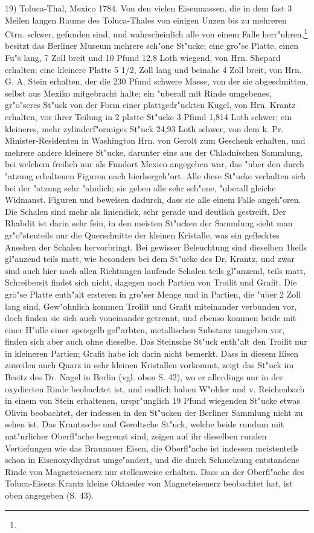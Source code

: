 \documentclass[a4paper, 11pt, oneside]{article}
\begin{document}
19) Toluca-Thal, Mexico 1784. Von den vielen Eisenmassen, die in dem fast 3 Meilen langen Raume des Toluca-Thales von einigen Unzen bis zu mehreren Ctrn. schwer, gefunden sind, und wahrscheinlich alle von einem Falle herr"uhren,\footnote{} besitzt das Berliner Museum mehrere sch"one St"ucke; eine gro"se Platte, einen Fu"s lang, 7 Zoll breit und 10 Pfund 12,8 Loth wiegend, von Hrn. Shepard erhalten; eine kleinere Platte 5 1/2, Zoll lang und beinahe 4 Zoll breit, von Hrn. G. A. Stein erhalten, der die 230 Pfund schwere Masse, von der sie abgeschnitten, selbst aus Mexiko mitgebracht halte; ein "uberall mit Rinde umgebenes, gr"o"seres St"uck von der Form einer plattgedr"uckten Kugel, von Hrn. Krantz erhalten, vor ihrer Teilung in 2 platte St"ucke 3 Pfund 1,814 Loth schwer; ein kleineres, mehr zylinderf"ormiges St"uck 24,93 Loth schwer, von dem k. Pr. Minister-Residenten in Washington Hrn. von Gerolt zum Geschenk erhalten, und mehrere andere kleinere St"ucke, darunter eins aus der Chladnischen Sammlung, bei welchem freilich nur als Fundort Mexico angegeben war, das "uber den durch "atzung erhaltenen Figuren nach hierhergeh"ort. Alle diese St"ucke verhalten sich bei der "atzung sehr "ahnlich; sie geben alle sehr sch"one, "uberall gleiche Widmanst. Figuren und beweisen dadurch, dass sie alle einem Falle angeh"oren. Die Schalen sind mehr als liniendick, sehr gerade und deutlich gestreift. Der Rhabdit ist darin sehr fein, in den meisten St"ucken der Sammlung sieht man gr"o"stenteils nur die Querschnitte der kleinen Kristalle, was ein geflecktes Ansehen der Schalen hervorbringt. Bei gewisser Beleuchtung sind dieselben 1heils gl"anzend teils matt, wie besonders bei dem St"ucke des Dr. Krantz, und zwar sind auch hier nach allen Richtungen laufende Schalen teils gl"anzend, teils matt, Schreibersit findet sich nicht, dagegen noch Partien von Troilit und Grafit. Die gro"se Platte enth"alt ersteren in gro"ser Menge und in Partien, die "uber 2 Zoll lang sind. Gew"ohnlich kommen Troilit und Grafit miteinander verbunden vor, doch finden sie sich auch voneinander getrennt, und ebenso kommen beide mit einer H"ulle einer speisgelb gef"arbten, metallischen Substanz umgeben vor, finden sich aber auch ohne dieselbe. Das Steinsche St"uck enth"alt den Troilit nur in kleineren Partien; Grafit habe ich darin nicht bemerkt. Dass in diesem Eisen zuweilen auch Quarz in sehr kleinen Kristallen vorkommt, zeigt das St"uck im Besitz des Dr. Nagel in Berlin (vgl. oben S. 42), wo er allerdings nur in der oxydierten Rinde beobachtet ist, und endlich haben W"ohler und v. Reichenbach in einem von Stein erhaltenen, urspr"unglich 19 Pfund wiegenden St"ucke etwas Olivin beobachtet, der indessen in den St"ucken der Berliner Sammlung nicht zu sehen ist. Das Krantzsche und Geroltsche St"uck, welche beide rundum mit nat"urlicher Oberfl"ache begrenzt sind, zeigen auf ihr dieselben runden Vertiefungen wie das Braunauer Eisen, die Oberfl"ache ist indessen meistenteils schon in Eisenoxydhydrat umge"andert, und die durch Schmelzung entstandene Rinde von Magneteisenerz nur stellenweise erhalten. Dass an der Oberfl"ache des Toluca-Eisens Krantz kleine Oktaeder von Magneteisenerz beobachtet hat, ist oben angegeben (S. 43).
\end{document}
